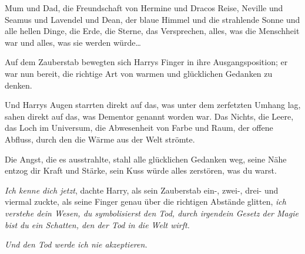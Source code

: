 Mum und Dad, die Freundschaft von Hermine und Dracos Reise, Neville und Seamus und Lavendel und Dean, der blaue Himmel und die strahlende Sonne und alle hellen Dinge, die Erde, die Sterne, das Versprechen, alles, was die Menschheit war und alles, was sie werden würde…

Auf dem Zauberstab bewegten sich Harrys Finger in ihre Ausgangsposition; er war nun bereit, die richtige Art von warmen und glücklichen Gedanken zu denken.

Und Harrys Augen starrten direkt auf das, was unter dem zerfetzten Umhang lag, sahen direkt auf das, was Dementor genannt worden war. Das Nichts, die Leere, das Loch im Universum, die Abwesenheit von Farbe und Raum, der offene Abfluss, durch den die Wärme aus der Welt strömte.

Die Angst, die es ausstrahlte, stahl alle glücklichen Gedanken weg, seine Nähe entzog dir Kraft und Stärke, sein Kuss würde alles zerstören, was du warst.

\emph{Ich kenne dich jetzt}, dachte Harry, als sein Zauberstab ein-, zwei-, drei- und viermal zuckte, als seine Finger genau über die richtigen Abstände glitten, \emph{ich verstehe dein Wesen, du symbolisierst den Tod, durch irgendein Gesetz der Magie bist du ein Schatten, den der Tod in die Welt wirft.}

\emph{Und den Tod werde ich nie akzeptieren.}

